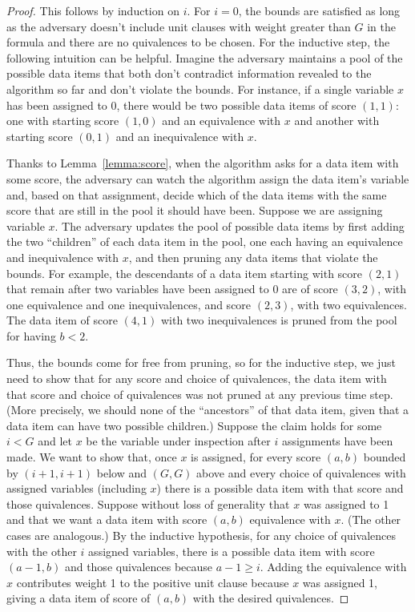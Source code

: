 \documentclass[11pt,letter]{article}
\numberwithin{theorem}{section}
\begin{document}
\begin{proof}
  This follows by induction on $i$.
  For $i = 0$, the bounds are satisfied
  as long as the adversary doesn't include unit clauses
  with weight greater than $G$ in the formula
  and there are no quivalences to be chosen.
  For the inductive step, the following intuition can be helpful.
  Imagine the adversary maintains a pool of the possible data items
  that both don't contradict information revealed to the algorithm so far
  and don't violate the bounds.
  For instance, if a single variable $x$ has been assigned to 0,
  there would be two possible data items of score $(1,1)$:
  one with starting score $(1,0)$ and an equivalence with $x$
  and another with starting score $(0,1)$ and an inequivalence with $x$.

  Thanks to Lemma~\ref{lemma:score},
  when the algorithm asks for a data item with some score,
  the adversary can watch the algorithm assign the data item's variable
  and, based on that assignment,
  decide which of the data items with the same score
  that are still in the pool it should have been.
  Suppose we are assigning variable $x$.
  The adversary updates the pool of possible data items
  by first adding the two ``children'' of each data item in the pool,
  one each having an equivalence and inequivalence with $x$,
  and then pruning any data items that violate the bounds.
  For example, the descendants of a data item starting with score $(2,1)$
  that remain after two variables have been assigned to 0
  are of score $(3,2)$, with one equivalence and one inequivalences,
  and score $(2,3)$, with two equivalences.
  The data item of score $(4,1)$ with two inequivalences
  is pruned from the pool for having $b < 2$.

  Thus, the bounds come for free from pruning,
  so for the inductive step,
  we just need to show that for any score and choice of quivalences,
  the data item with that score and choice of quivalences
  was not pruned at any previous time step.
  (More precisely,
  we should none of the ``ancestors'' of that data item,
  given that a data item can have two possible children.)
  Suppose the claim holds for some $i < G$
  and let $x$ be the variable under inspection
  after $i$ assignments have been made.
  We want to show that, once $x$ is assigned,
  for every score $(a,b)$ bounded by $(i+1,i+1)$ below and $(G,G)$ above
  and every choice of quivalences with assigned variables (including $x$)
  there is a possible data item with that score and those quivalences.
  Suppose without loss of generality that $x$ was assigned to 1
  and that we want a data item with score $(a,b)$ equivalence with $x$.
  (The other cases are analogous.)
  By the inductive hypothesis,
  for any choice of quivalences with the other $i$ assigned variables,
  there is a possible data item with score $(a-1,b)$ and those quivalences
  because $a-1 \geq i$.
  Adding the equivalence with $x$
  contributes weight 1 to the positive unit clause because $x$ was assigned 1,
  giving a data item of score of $(a,b)$ with the desired quivalences.
\end{proof}
\end{document}
